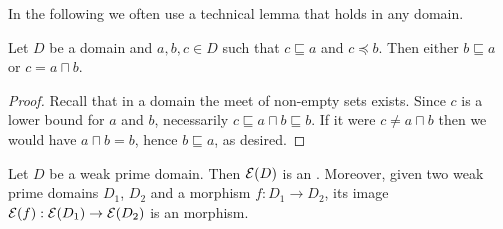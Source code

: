 In the following we often use a technical lemma that holds in any domain.

\begin{lemma}
  \label{le:inf}
  Let $D$ be a domain and $a, b, c \in D$ such that
  $c \sqsubseteq a$ and $c \preceq b$. Then
  either $b \sqsubseteq a$ or $c = a \sqcap b$.
\end{lemma}


\begin{proof}
  Recall that in a domain the meet of non-empty  sets
  exists. Since $c$ is a lower bound for $a$ and $b$, necessarily
  $c \sqsubseteq a\sqcap b \sqsubseteq b$. If it were
  $c \neq a\sqcap b$ then we would have $a \sqcap b = b$, hence
  $b \sqsubseteq a$, as desired.
\end{proof}




\begin{lemma}
  \label{le:domain-to-es-wd}
  Let  $D$ be a weak prime domain. Then $\mathcal{E}({D})$ is an {\esabbr}. Moreover, given two weak prime domains $D_1$, $D_2$ and a
  morphism $f : D_1 \to D_2$, its image
  $\mathcal{E}({f}) : \mathcal{E}({D_1}) \to \mathcal{E}({D_2})$ is an {\esabbr} morphism.
\end{lemma}


